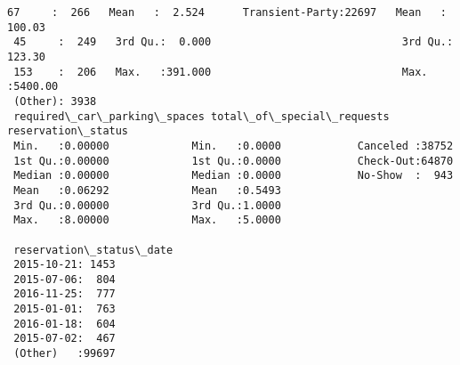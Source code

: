 \documentclass[11pt]{article}
\begin{document}
\begin{Verbatim}[commandchars=\\\{\}]
 67     :  266   Mean   :  2.524      Transient-Party:22697   Mean   : 100.03  
 45     :  249   3rd Qu.:  0.000                              3rd Qu.: 123.30  
 153    :  206   Max.   :391.000                              Max.   :5400.00  
 (Other): 3938                                                                 
 required\_car\_parking\_spaces total\_of\_special\_requests reservation\_status
 Min.   :0.00000             Min.   :0.0000            Canceled :38752   
 1st Qu.:0.00000             1st Qu.:0.0000            Check-Out:64870   
 Median :0.00000             Median :0.0000            No-Show  :  943   
 Mean   :0.06292             Mean   :0.5493                              
 3rd Qu.:0.00000             3rd Qu.:1.0000                              
 Max.   :8.00000             Max.   :5.0000                              
                                                                         
 reservation\_status\_date
 2015-10-21: 1453       
 2015-07-06:  804       
 2016-11-25:  777       
 2015-01-01:  763       
 2016-01-18:  604       
 2015-07-02:  467       
 (Other)   :99697       
    \end{Verbatim}
\end{document}
